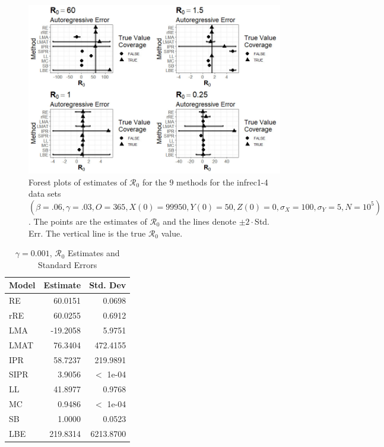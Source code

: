 \documentclass[12pt]{article}
\newcommand{\xxsir}{\ensuremath{9} } %
\newcommand{\rr}{\ensuremath{\mathcal{R}_0}}
\begin{document}
\begin{figure}[H]
	\centering
	\includegraphics[scale=0.5]{images/parchange_ar.jpg}
	\caption{Forest plots of estimates of $\rr$ for the \xxsir methods for the infrec1-4 data sets $(\beta=.06, \gamma=.03, O=365, X(0)=99950, Y(0)=50, Z(0)=0, \sigma_X=100, \sigma_Y=5, N=10^5)$.  The points are the estimates of $\rr$ and the lines denote $\pm 2\cdot $Std. Err.  The vertical line is the true $\rr$ value.}
\end{figure}
\begin{table}[H]
	
	\centering
	\begin{tabular}[t]{l|r|r}
		\hline
		Model & Estimate & Std. Dev\\
		\hline
		RE & 60.0151 & 0.0698\\
		\hline
		rRE & 60.0255 & 0.6912\\
		\hline
		LMA & -19.2058 & 5.9751\\
		\hline
		LMAT & 76.3404 & 472.4155\\
		\hline
		IPR & 58.7237 & 219.9891\\
		\hline
		SIPR & 3.9056 & $<$ 1e-04\\
		\hline
		LL & 41.8977 & 0.9768\\
		\hline
		MC & 0.9486 & $<$ 1e-04\\
		\hline
		SB & 1.0000 & 0.0523\\
		\hline
		LBE & 219.8314 & 6213.8700 \\
		\hline
	\end{tabular}
	\caption{$\gamma = 0.001$, $\rr$ Estimates and Standard Errors}
\end{table}
\end{document}
